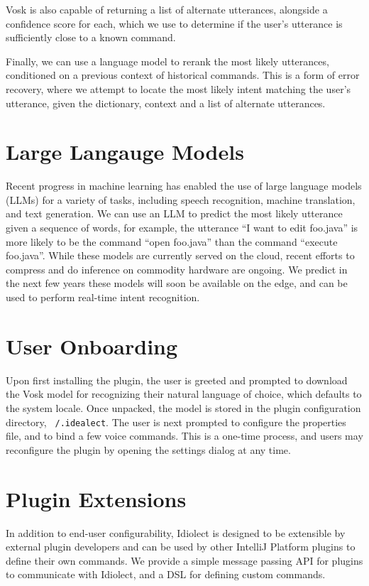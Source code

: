\documentclass[conference]{IEEEtran}
\begin{document}
Vosk is also capable of returning a list of alternate utterances, alongside a confidence score for each, which we use to determine if the user's utterance is sufficiently close to a known command.

Finally, we can use a language model to rerank the most likely utterances, conditioned on a previous context of historical commands. This is a form of error recovery, where we attempt to locate the most likely intent matching the user's utterance, given the dictionary, context and a list of alternate utterances.

\section{Large Langauge Models}

Recent progress in machine learning has enabled the use of large language models (LLMs) for a variety of tasks, including speech recognition, machine translation, and text generation. We can use an LLM to predict the most likely utterance given a sequence of words, for example, the utterance ``I want to edit foo.java'' is more likely to be the command ``open foo.java'' than the command ``execute foo.java''. While these models are currently served on the cloud, recent efforts to compress and do inference on commodity hardware are ongoing. We predict in the next few years these models will soon be available on the edge, and can be used to perform real-time intent recognition.

\section{User Onboarding}

Upon first installing the plugin, the user is greeted and prompted to download the Vosk model for recognizing their natural language of choice, which defaults to the system locale. Once unpacked, the model is stored in the plugin configuration directory, \texttt{~/.idealect}. The user is next prompted to configure the properties file, and to bind a few voice commands. This is a one-time process, and users may reconfigure the plugin by opening the settings dialog at any time.

\section{Plugin Extensions}

In addition to end-user configurability, Idiolect is designed to be extensible by external plugin developers and can be used by other IntelliJ Platform plugins to define their own commands. We provide a simple message passing API for plugins to communicate with Idiolect, and a DSL for defining custom commands.
\end{document}
